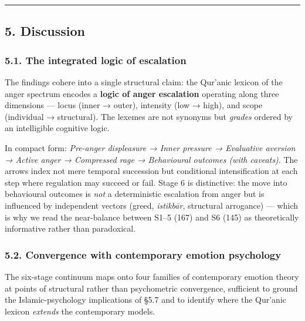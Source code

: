 \begin{center}\rule{0.5\linewidth}{0.5pt}\end{center}

\subsection{5. Discussion}\label{discussion}

\subsubsection{5.1. The integrated logic of
escalation}\label{the-integrated-logic-of-escalation}

The findings cohere into a single structural claim: the Qur'anic lexicon
of the anger spectrum encodes a \textbf{logic of anger escalation}
operating along three dimensions --- locus (inner → outer), intensity
(low → high), and scope (individual → structural). The lexemes are not
synonyms but \emph{grades} ordered by an intelligible cognitive logic.

In compact form: \emph{Pre-anger displeasure → Inner pressure →
Evaluative aversion → Active anger → Compressed rage → Behavioural
outcomes (with caveats)}. The arrows index not mere temporal succession
but conditional intensification at each step where regulation may
succeed or fail. Stage 6 is distinctive: the move into behavioural
outcomes is \emph{not} a deterministic escalation from anger but is
influenced by independent vectors (greed, \emph{istikbār}, structural
arrogance) --- which is why we read the near-balance between S1--5 (167)
and S6 (145) as theoretically informative rather than paradoxical.

\subsubsection{5.2. Convergence with contemporary emotion
psychology}\label{convergence-with-contemporary-emotion-psychology}

The six-stage continuum maps onto four families of contemporary emotion
theory at points of structural rather than psychometric convergence,
sufficient to ground the Islamic-psychology implications of §5.7 and to
identify where the Qur'anic lexicon \emph{extends} the contemporary
models.

